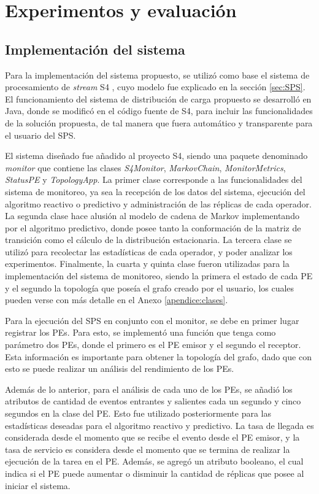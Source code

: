 \chapter{Experimentos y evaluación}
\label{cap:experimentos}

\section{Implementación del sistema}
Para la implementación del sistema propuesto, se utilizó como base el sistema de procesamiento de \textit{stream} S4 \citep{s4}, cuyo modelo fue explicado en la sección \ref{sec:SPS}. El funcionamiento del sistema de distribución de carga propuesto se desarrolló en Java, donde se modificó en el código fuente de S4, para incluir las funcionalidades de la solución propuesta, de tal manera que fuera automático y transparente para el usuario del SPS.

El sistema diseñado fue añadido al proyecto S4, siendo una paquete denominado \textit{monitor} que contiene las clases \textit{S4Monitor}, \textit{MarkovChain}, \textit{MonitorMetrics}, \textit{StatusPE} y \textit{TopologyApp}. La primer clase corresponde a las funcionalidades del sistema de monitoreo, ya sea la recepción de los datos del sistema, ejecución del algoritmo reactivo o predictivo y administración de las réplicas de cada operador. La segunda clase hace alusión al modelo de cadena de Markov implementando por el algoritmo predictivo, donde posee tanto la conformación de la matriz de transición como el cálculo de la distribución estacionaria. La tercera clase se utilizó para recolectar las estadísticas de cada operador, y poder analizar los experimentos. Finalmente, la cuarta y quinta clase fueron utilizadas para la implementación del sistema de monitoreo, siendo la primera el estado de cada PE y el segundo la topología que poseía el grafo creado por el usuario, los cuales pueden verse con más detalle en el Anexo \ref{apendice:clases}.

Para la ejecución del SPS en conjunto con el monitor, se debe en primer lugar registrar los PEs. Para esto, se implementó una función que tenga como parámetro dos PEs, donde el primero es el PE emisor y el segundo el receptor. Esta información es importante para obtener la topología del grafo, dado que con esto se puede realizar un análisis del rendimiento de los PEs.

Además de lo anterior, para el análisis de cada uno de los PEs, se añadió los atributos de cantidad de eventos entrantes y salientes cada un segundo y cinco segundos en la clase del PE. Esto fue utilizado posteriormente para las estadísticas deseadas para el algoritmo reactivo y predictivo. La tasa de llegada es considerada desde el momento que se recibe el evento desde el PE emisor, y la tasa de servicio es considera desde el momento que se termina de realizar la ejecución de la tarea en el PE. Además, se agregó un atributo booleano, el cual indica si el PE puede aumentar o disminuir la cantidad de réplicas que posee al iniciar el sistema.

